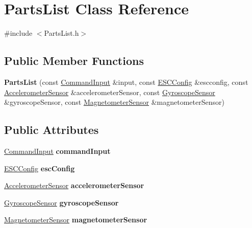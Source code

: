 \hypertarget{classPartsList}{}\section{Parts\+List Class Reference}
\label{classPartsList}


{\ttfamily \#include $<$Parts\+List.\+h$>$}

\subsection*{Public Member Functions}
\begin{DoxyCompactItemize}
\item 
\hypertarget{classPartsList_a1c992c0e2ff567f6eae2997d25aeb469}{}{\bfseries Parts\+List} (const \hyperlink{classCommandInput}{Command\+Input} \&input, const \hyperlink{classESCConfig}{E\+S\+C\+Config} \&escconfig, const \hyperlink{classAccelerometerSensor}{Accelerometer\+Sensor} \&accelerometer\+Sensor, const \hyperlink{classGyroscopeSensor}{Gyroscope\+Sensor} \&gyroscope\+Sensor, const \hyperlink{classMagnetometerSensor}{Magnetometer\+Sensor} \&magnetometer\+Sensor)\label{classPartsList_a1c992c0e2ff567f6eae2997d25aeb469}

\end{DoxyCompactItemize}
\subsection*{Public Attributes}
\begin{DoxyCompactItemize}
\item 
\hypertarget{classPartsList_af7264b7c20a5ed198c75d6852e9e68a9}{}\hyperlink{classCommandInput}{Command\+Input} {\bfseries command\+Input}\label{classPartsList_af7264b7c20a5ed198c75d6852e9e68a9}

\item 
\hypertarget{classPartsList_a6138ab9e8359c557324a18f5f5849254}{}\hyperlink{classESCConfig}{E\+S\+C\+Config} {\bfseries esc\+Config}\label{classPartsList_a6138ab9e8359c557324a18f5f5849254}

\item 
\hypertarget{classPartsList_a2c7e98fdd3331ce7691197216789d9a6}{}\hyperlink{classAccelerometerSensor}{Accelerometer\+Sensor} {\bfseries accelerometer\+Sensor}\label{classPartsList_a2c7e98fdd3331ce7691197216789d9a6}

\item 
\hypertarget{classPartsList_a4111dff301073ea25c125b5d0778ad55}{}\hyperlink{classGyroscopeSensor}{Gyroscope\+Sensor} {\bfseries gyroscope\+Sensor}\label{classPartsList_a4111dff301073ea25c125b5d0778ad55}

\item 
\hypertarget{classPartsList_a9e344eccaec4f6410a1fc9028bcb0f37}{}\hyperlink{classMagnetometerSensor}{Magnetometer\+Sensor} {\bfseries magnetometer\+Sensor}\label{classPartsList_a9e344eccaec4f6410a1fc9028bcb0f37}

\end{DoxyCompactItemize}


